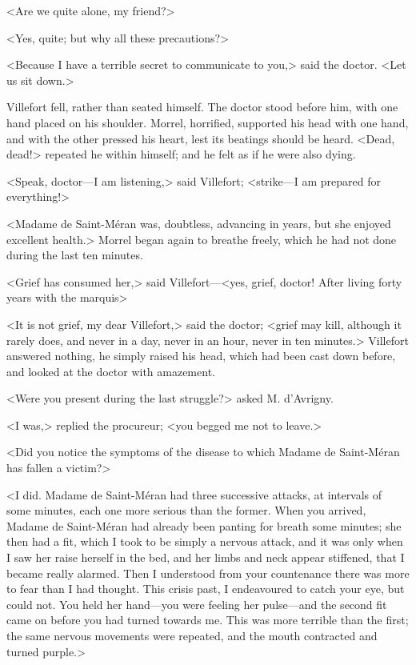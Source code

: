  <Are we quite alone, my friend?> 

 <Yes, quite; but why all these precautions?> 

 <Because I have a terrible secret to communicate to you,> said the doctor. <Let us sit down.> 

 Villefort fell, rather than seated himself. The doctor stood before him, with one hand placed on his shoulder. Morrel, horrified, supported his head with one hand, and with the other pressed his heart, lest its beatings should be heard. <Dead, dead!> repeated he within himself; and he felt as if he were also dying. 

 <Speak, doctor—I am listening,> said Villefort; <strike—I am prepared for everything!> 

 <Madame de Saint-Méran was, doubtless, advancing in years, but she enjoyed excellent health.> Morrel began again to breathe freely, which he had not done during the last ten minutes. 

 <Grief has consumed her,> said Villefort—<yes, grief, doctor! After living forty years with the marquis\longdash> 

 <It is not grief, my dear Villefort,> said the doctor; <grief may kill, although it rarely does, and never in a day, never in an hour, never in ten minutes.> Villefort answered nothing, he simply raised his head, which had been cast down before, and looked at the doctor with amazement. 

 <Were you present during the last struggle?> asked M. d'Avrigny. 

 <I was,> replied the procureur; <you begged me not to leave.> 

 <Did you notice the symptoms of the disease to which Madame de Saint-Méran has fallen a victim?> 

 <I did. Madame de Saint-Méran had three successive attacks, at intervals of some minutes, each one more serious than the former. When you arrived, Madame de Saint-Méran had already been panting for breath some minutes; she then had a fit, which I took to be simply a nervous attack, and it was only when I saw her raise herself in the bed, and her limbs and neck appear stiffened, that I became really alarmed. Then I understood from your countenance there was more to fear than I had thought. This crisis past, I endeavoured to catch your eye, but could not. You held her hand—you were feeling her pulse—and the second fit came on before you had turned towards me. This was more terrible than the first; the same nervous movements were repeated, and the mouth contracted and turned purple.> 

